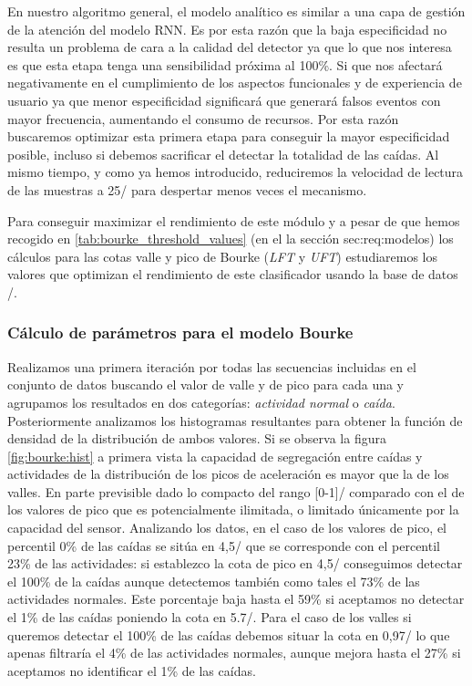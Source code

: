 En nuestro algoritmo general, el modelo analítico es similar a una capa de gestión de la atención del modelo RNN. Es por esta razón que la baja especificidad  no resulta un problema de cara a la calidad del detector ya que lo que nos interesa es que esta etapa tenga una sensibilidad próxima al 100\%. Si que nos afectará negativamente en el cumplimiento de los aspectos funcionales y de experiencia de usuario ya que menor especificidad significará que generará falsos eventos con mayor frecuencia, aumentando el consumo de recursos. Por esta razón buscaremos optimizar esta primera etapa para conseguir la mayor especificidad posible, incluso si debemos sacrificar el detectar la totalidad de las caídas. Al mismo tiempo, y como ya hemos introducido, reduciremos la velocidad de lectura de las muestras a 25\hz/ para despertar menos veces el mecanismo. 

Para conseguir maximizar el rendimiento de este módulo y a pesar de que hemos recogido en \autoref{tab:bourke_threshold_values} (en el la sección \refname{sec:req:modelos}) los cálculos para las cotas valle y pico de Bourke (\textit{LFT} y \textit{UFT}) estudiaremos los valores que optimizan el rendimiento de este clasificador usando la base de datos \sisfall/. 

\subsubsection{Cálculo de parámetros para el modelo Bourke}

Realizamos una primera iteración por todas las secuencias incluidas en el conjunto de datos buscando el valor de valle y de pico para cada una y agrupamos los resultados en dos categorías: \textit{actividad normal} o \textit{caída}. Posteriormente analizamos los histogramas resultantes para obtener la función de densidad de la distribución de ambos valores. Si se observa la figura \ref{fig:bourke:hist} a primera vista la capacidad de segregación entre caídas y actividades de la distribución de los picos de aceleración es mayor que la de los valles. En parte previsible dado lo compacto del rango [0-1]\g/ comparado con el de los valores de pico que es potencialmente ilimitada, o limitado únicamente por la capacidad del sensor. Analizando los datos, en el caso de los valores de pico, el percentil 0\% de las caídas se sitúa en 4,5\g/ que se corresponde con el percentil 23\% de las actividades: si establezco la cota de pico en 4,5\g/ conseguimos detectar el 100\% de la caídas aunque detectemos también como tales el 73\% de las actividades normales. Este porcentaje baja hasta el 59\% si aceptamos no detectar el 1\% de las caídas poniendo la cota en 5.7\g/. Para el caso de los valles si queremos detectar el 100\% de las caídas debemos situar la cota en 0,97\g/ lo que apenas filtraría el 4\% de las actividades normales, aunque mejora hasta el 27\% si aceptamos no identificar el 1\% de las caídas.


